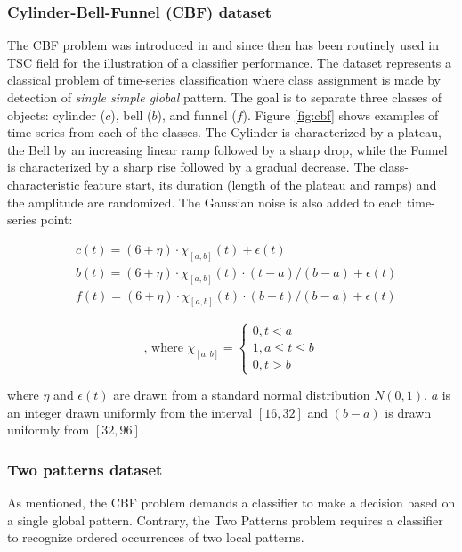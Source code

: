 \subsubsection{Cylinder-Bell-Funnel (CBF) dataset}
The CBF problem was introduced in \cite{cbf} and since then has been routinely used in TSC field for the illustration 
of a classifier performance.
The dataset represents a classical problem of time-series classification where class assignment is made by detection 
of \textit{single simple global} pattern. 
The goal is to separate three classes of objects: cylinder ($c$), bell ($b$), and funnel ($f$).  Figure \ref{fig:cbf} 
shows examples of time series from each of the classes. 
The Cylinder is characterized by a plateau, the Bell by an increasing linear ramp followed by a sharp drop, 
while the Funnel is characterized by a sharp rise followed by a gradual decrease. 
The class-characteristic feature start, its duration (length of the plateau and ramps) and the amplitude are randomized. 
The Gaussian noise is also added to each time-series point:

\noindent\begin{minipage}{.5\linewidth}
\begin{equation*}
\begin{split}
 &c(t)=(6+\eta)\cdot\chi_{[a,b]}(t)+\epsilon(t) \\
 & b(t)=(6+\eta)\cdot\chi_{[a,b]}(t)\cdot(t-a)/(b-a)+\epsilon(t) \\
 & f(t)=(6+\eta)\cdot\chi_{[a,b]}(t)\cdot(b-t)/(b-a)+\epsilon(t)
\end{split}
\end{equation*}
\end{minipage}%
\begin{minipage}{.5\linewidth}
\begin{equation}
\label{eq:cbf}
\text{, where }
\chi_{[a,b]}=\begin{cases}
0,t < a \\
1,a\leq t\leq b\\
0,t > b \end{cases}
\end{equation}
\end{minipage}
\vspace{0.5cm}

where $\eta$ and $\epsilon(t)$ are drawn from a standard normal distribution $N(0,1)$, $a$ is an integer 
drawn uniformly from the interval $[16,32]$ and $(b-a)$ is drawn uniformly from $[32,96]$.

\subsubsection{Two patterns dataset}
As mentioned, the CBF problem demands a classifier to make a decision based on a single global pattern. 
Contrary, the Two Patterns problem requires a classifier to recognize ordered occurrences of two local patterns.

